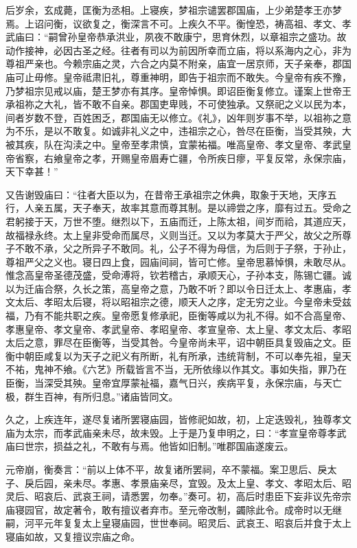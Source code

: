 \documentclass[12pt,UTF8]{ctexbook}
\begin{document}
后岁余，玄成薨，匡衡为丞相。上寝疾，梦祖宗谴罢郡国庙，上少弟楚孝王亦梦焉。上诏问衡，议欲复之，衡深言不可。上疾久不平。衡惶恐，祷高祖、孝文、孝武庙曰：“嗣曾孙皇帝恭承洪业，夙夜不敢康宁，思育休烈，以章祖宗之盛功。故动作接神，必因古圣之经。往者有司以为前因所幸而立庙，将以系海内之心，非为尊祖严亲也。今赖宗庙之灵，六合之内莫不附亲，庙宜一居京师，天子亲奉，郡国庙可止毋修。皇帝祗肃旧礼，尊重神明，即告于祖宗而不敢失。今皇帝有疾不豫，乃梦祖宗见戒以庙，楚王梦亦有其序。皇帝悼惧。即诏臣衡复修立。谨案上世帝王承祖祢之大礼，皆不敢不自亲。郡国吏卑贱，不可使独承。又祭祀之义以民为本，间者岁数不登，百姓困乏，郡国庙无以修立。《礼》，凶年则岁事不举，以祖祢之意为不乐，是以不敢复。如诚非礼义之中，违祖宗之心，咎尽在臣衡，当受其殃，大被其疾，队在沟渎之中。皇帝至孝肃慎，宜蒙祐福。唯高皇帝、孝文皇帝、孝武皇帝省察，右飨皇帝之孝，开赐皇帝眉寿亡疆，令所疾日瘳，平复反常，永保宗庙，天下幸甚！”



又告谢毁庙曰：“往者大臣以为，在昔帝王承祖宗之休典，取象于天地，天序五行，人亲五属，天子奉天，故率其意而尊其制。是以禘尝之序，靡有过五。受命之君躬接于天，万世不堕。继烈以下，五庙而迁，上陈太祖，间岁而祫，其道应天，故福禄永终。太上皇非受命而属尽，义则当迁。又以为孝莫大于严父，故父之所尊子不敢不承，父之所异子不敢同。礼，公子不得为母信，为后则于子祭，于孙止，尊祖严父之义也。寝日四上食，园庙间祠，皆可亡修。皇帝思慕悼惧，未敢尽从。惟念高皇帝圣德茂盛，受命溥将，钦若稽古，承顺天心，子孙本支，陈锡亡疆。诚以为迁庙合祭，久长之策，高皇帝之意，乃敢不听？即以令日迁太上、孝惠庙，孝文太后、孝昭太后寝，将以昭祖宗之德，顺天人之序，定无穷之业。今皇帝未受兹福，乃有不能共职之疾。皇帝愿复修承祀，臣衡等咸以为礼不得。如不合高皇帝、孝惠皇帝、孝文皇帝、孝武皇帝、孝昭皇帝、孝宣皇帝、太上皇、孝文太后、孝昭太后之意，罪尽在臣衡等，当受其咎。今皇帝尚未平，诏中朝臣具复毁庙之文。臣衡中朝臣咸复以为天子之祀义有所断，礼有所承，违统背制，不可以奉先祖，皇天不祐，鬼神不飨。《六艺》所载皆言不当，无所依缘以作其文。事如失指，罪乃在臣衡，当深受其殃。皇帝宜厚蒙祉福，嘉气日兴，疾病平复，永保宗庙，与天亡极，群生百神，有所归息。”诸庙皆同文。



久之，上疾连年，遂尽复诸所罢寝庙园，皆修祀如故，初，上定迭毁礼，独尊孝文庙为太宗，而孝武庙亲未尽，故未毁。上于是乃复申明之，曰：“孝宣皇帝尊孝武庙曰世宗，损益之礼，不敢有与焉。他皆如旧制。”唯郡国庙遂废云。



元帝崩，衡奏言：“前以上体不平，故复诸所罢祠，卒不蒙福。案卫思后、戾太子、戾后园，亲未尽。孝惠、孝景庙亲尽，宜毁。及太上皇、孝文、孝昭太后、昭灵后、昭哀后、武哀王祠，请悉罢，勿奉。”奏可。初，高后时患臣下妄非议先帝宗庙寝园官，故定著令，敢有擅议者弃市。至元帝改制，蠲除此令。成帝时以无继嗣，河平元年复复太上皇寝庙园，世世奉祠。昭灵后、武哀王、昭哀后并食于太上寝庙如故，又复擅议宗庙之命。
\end{document}
